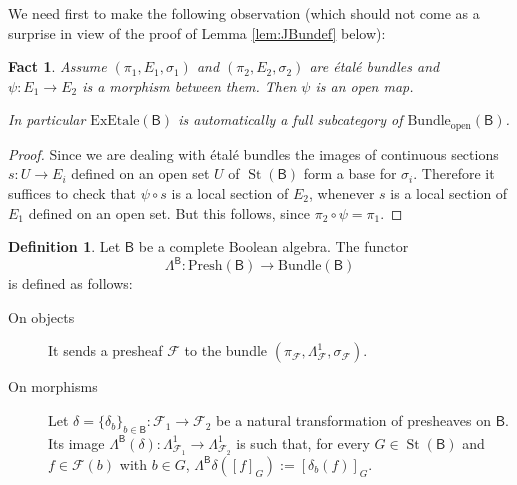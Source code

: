 \documentclass[11pt]{amsart}
\newcommand{\F}{\mathcal{F}}
\newcommand{\Presh}{\textrm{Presh}}
\newcommand{\bundle}{\textrm{Bundle}}
\newcommand{\exbundle}{\textrm{ExBundle}}
\newcommand{\bundleopen}{\textrm{Bundle}_{\textrm{open}}}
\newcommand{\exetale}{\textrm{ExEtale}}
\theoremstyle{plain}
\newtheorem{fact}[theorem]{Fact}
\theoremstyle{definition}
\newtheorem{definition}[theorem]{Definition}
\theoremstyle{plain}
\theoremstyle{remark}
\DeclareMathOperator{\St}{St}
\newcommand{\bool}[1]{\mathsf{#1}}
\newcommand{\0}{\mathsf{0}}
\renewcommand{\1}{\mathsf{1}}
\renewcommand{\2}{\mathsf{2}}
\theoremstyle{definition}
\begin{document}

We need first to make the following observation (which should not come as a surprise in view of the proof of Lemma \ref{lem:JBundef} below):

\begin{fact}
Assume $(\pi_1,E_1,\sigma_1)$ and $(\pi_2,E_2,\sigma_2)$ are \'etal\'e bundles and 
$\psi:E_1\to E_2$ is a morphism between them. Then $\psi$ is an open map.

In particular $\exetale(\bool{B})$ is automatically a full subcategory of $\bundleopen(\bool{B})$.
\end{fact}
\begin{proof}
Since we are dealing with \'etal\'e bundles the images of continuous sections $s:U\to E_i$ defined on an open set $U$ of $\St(\bool{B})$ form a base for $\sigma_i$.
Therefore it suffices to check that $\psi\circ s$ is a local section of $E_2$, whenever $s$ is a local section of $E_1$ defined on an open set. But this follows, since $\pi_2\circ\psi=\pi_1$.
\end{proof}

\begin{definition}\label{def:LambdaB}
Let $\bool{B}$ be a complete Boolean algebra.
 The functor 
\[
\Lambda^{\bool{B}}:\Presh(\bool{B})\to\bundle(\bool{B})
\]
is defined as follows: 
\begin{description}
\item[On objects] It sends a presheaf $\F$ to the bundle $(\pi_\F, \Lambda^1_\F, \sigma_\F)$. 
\item[On morphisms] Let $\delta=\{\delta_b\}_{b\in\bool{B}}:\F_1\to\F_2$ be a natural transformation of presheaves on $\bool{B}$. Its image $\Lambda^{\bool{B}}(\delta):\Lambda^1_{\F_1}\to\Lambda^1_{\F_2}$ is such that, for every $G\in\St(\bool{B})$ and $f\in\F(b)$ with $b\in G$, $\Lambda^\bool{B}\delta([f]_{G}):=[\delta_b(f)]_{G}$.
\end{description}
\end{definition}
\end{document}
